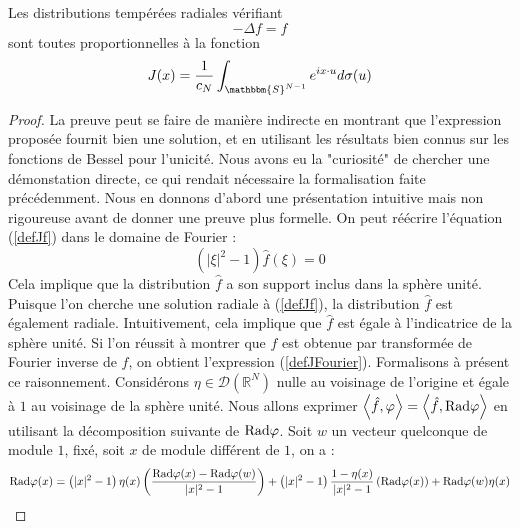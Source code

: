\documentclass[11pt,a4paper]{article}
\begin{document}
\begin{The} Les distributions tempérées radiales vérifiant  \begin{equation}
- \Delta f = f
\label{defJf}
\end{equation}
sont toutes proportionnelles à la fonction \begin{equation}
J(x) = \frac{1}{c_N}\int_{\mathbbm{S}^{N-1}} e^{ix \cdot u}d\sigma(u)
\label{defJFourier}
\end{equation} 
\begin{proof}
La preuve peut se faire de manière indirecte en montrant que l'expression proposée fournit bien une solution, et en utilisant les résultats bien connus sur les fonctions de Bessel pour l'unicité. Nous avons eu la "curiosité" de chercher une démonstation directe, ce qui rendait nécessaire la formalisation faite précédemment. Nous en donnons d'abord une présentation intuitive mais non rigoureuse avant de donner une preuve plus formelle. On peut réécrire l'équation  (\ref{defJf}) dans le domaine de Fourier : \begin{equation}
\left(|\xi|^2-1\right)\hat{f}(\xi) = 0
\end{equation}
Cela implique que la distribution $\hat{f}$ a son support inclus dans la sphère unité. Puisque l'on cherche une solution radiale à (\ref{defJf}), la distribution $\hat{f}$ est également radiale. Intuitivement, cela implique que $\hat{f}$ est égale à l'indicatrice de la sphère unité. Si l'on réussit à montrer que $f$ est obtenue par transformée de Fourier inverse de $\hat{f}$, on obtient l'expression (\ref{defJFourier}). Formalisons à présent ce raisonnement. Considérons $\eta \in \mathcal{D}(\mathbb{R}^N)$ nulle au voisinage de l'origine et égale à $1$ au voisinage de la sphère unité. Nous allons exprimer $\left\langle \hat{f},\varphi\right\rangle = \left\langle \hat{f},\textup{Rad}\varphi\right\rangle$ en utilisant la décomposition suivante de $\textup{Rad}\varphi$. Soit $w$ un vecteur quelconque de module $1$, fixé, soit $x$ de module différent de $1$, on a : 
\[\textup{Rad}\varphi(x) = \left(|x|^2 - 1\right)\eta(x)\left(\frac{\textup{Rad}\varphi(x) - \textup{Rad}\varphi(w)}{|x|^2 - 1}\right) + \left(|x|^2 - 1\right)\frac{1-\eta(x)}{|x|^2 - 1}\left(\textup{Rad}\varphi(x)\right) + \textup{Rad}\varphi(w)\eta(x)\]

\end{proof}
\end{The}
\end{document}
